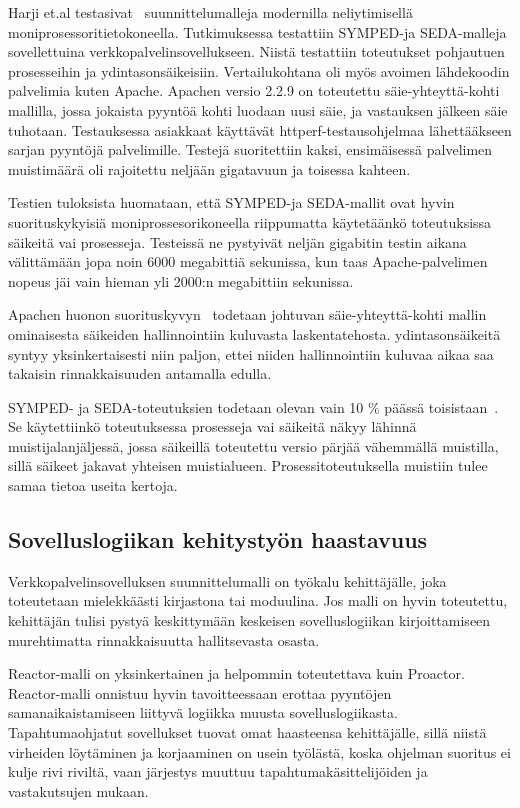 \documentclass[finnish]{tktltiki2}%
\theoremstyle{definition}
\theoremstyle{remark}
\begin{document}
Harji et.al testasivat~\cite{harji_comparing_2012} suunnittelumalleja 
modernilla neliytimisellä moniprosessoritietokoneella. Tutkimuksessa
testattiin SYMPED-ja SEDA-malleja sovellettuina verkkopalvelinsovellukseen.
Niistä testattiin toteutukset pohjautuen prosesseihin ja
ydintasonsäikeisiin.
Vertailukohtana oli myös avoimen lähdekoodin palvelimia kuten Apache. Apachen 
versio 2.2.9 on toteutettu säie-yhteyttä-kohti mallilla, jossa
jokaista pyyntöä kohti luodaan uusi säie, ja vastauksen jälkeen säie tuhotaan.
Testauksessa asiakkaat käyttävät httperf-testausohjelmaa lähettääkseen
sarjan pyyntöjä palvelimille.
Testejä suoritettiin kaksi, ensimäisessä palvelimen muistimäärä
oli rajoitettu neljään gigatavuun ja toisessa kahteen.

Testien tuloksista huomataan, että SYMPED-ja SEDA-mallit
ovat hyvin suorituskykyisiä moniprossesorikoneella riippumatta käytetäänkö
toteutuksissa säikeitä vai prosesseja. Testeissä ne pystyivät
neljän gigabitin testin aikana välittämään jopa noin 6000 megabittiä sekunissa,
kun taas Apache-palvelimen nopeus jäi vain hieman yli 2000:n megabittiin
sekunissa.

Apachen huonon suorituskyvyn~\cite{harji_comparing_2012} 
todetaan johtuvan säie-yhteyttä-kohti mallin
ominaisesta säikeiden hallinnointiin kuluvasta laskentatehosta.
ydintasonsäikeitä syntyy yksinkertaisesti niin paljon,
ettei niiden hallinnointiin kuluvaa aikaa saa 
takaisin rinnakkaisuuden antamalla edulla.

SYMPED- ja SEDA-toteutuksien todetaan olevan vain 10 $\%$ päässä
toisistaan~\cite{harji_comparing_2012}. Se käytettiinkö toteutuksessa
prosesseja vai säikeitä
näkyy lähinnä muistijalanjäljessä, jossa säikeillä toteutettu versio
pärjää vähemmällä muistilla, sillä säikeet jakavat
yhteisen muistialueen. Prosessitoteutuksella muistiin tulee
samaa tietoa useita kertoja.

\subsection{Sovelluslogiikan kehitystyön haastavuus}
Verkkopalvelinsovelluksen suunnittelumalli on työkalu kehittäjälle,
joka toteutetaan mielekkäästi kirjastona tai moduulina.
Jos malli on hyvin toteutettu, kehittäjän tulisi pystyä
keskittymään keskeisen sovelluslogiikan kirjoittamiseen
murehtimatta rinnakkaisuutta hallitsevasta osasta.

Reactor-malli on yksinkertainen ja helpommin toteutettava
kuin Proactor. Reactor-malli onnistuu hyvin tavoitteessaan
erottaa pyyntöjen samanaikaistamiseen liittyvä logiikka
muusta sovelluslogiikasta.
Tapahtumaohjatut sovellukset tuovat omat haasteensa
kehittäjälle, sillä niistä virheiden löytäminen ja
korjaaminen on usein työlästä, koska ohjelman
suoritus ei kulje rivi riviltä, vaan järjestys
muuttuu tapahtumakäsittelijöiden ja vastakutsujen mukaan.
\end{document}
